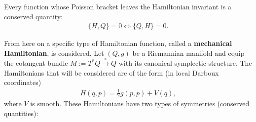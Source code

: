     \begin{property}
        Every function whose Poisson bracket leaves the Hamiltonian invariant is a conserved quantity:
        \begin{gather}
            \{H,Q\} = 0\iff\{Q,H\} = 0.
        \end{gather}
    \end{property}

    From here on a specific type of Hamiltonian function, called a \textbf{mechanical Hamiltonian}, is considered. Let $(Q,g)$ be a Riemannian manifold and equip the cotangent bundle $M:=T^*Q\overset{\pi}{\rightarrow}Q$ with its canonical symplectic structure. The Hamiltonians that will be considered are of the form (in local Darboux coordinates)
    \begin{gather}
        H(q,p) = \frac{1}{2}g(p,p) + V(q),
    \end{gather}
    where $V$ is smooth. These Hamiltonians have two types of symmetries (conserved quantities):

